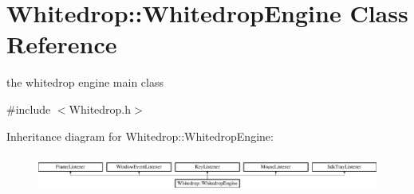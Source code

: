 \hypertarget{class_whitedrop_1_1_whitedrop_engine}{\section{Whitedrop\+:\+:Whitedrop\+Engine Class Reference}
\label{class_whitedrop_1_1_whitedrop_engine}
}


the whitedrop engine main class  




{\ttfamily \#include $<$Whitedrop.\+h$>$}

Inheritance diagram for Whitedrop\+:\+:Whitedrop\+Engine\+:\begin{figure}[H]
\begin{center}
\leavevmode
\includegraphics[height=1.251397cm]{class_whitedrop_1_1_whitedrop_engine}
\end{center}
\end{figure}
